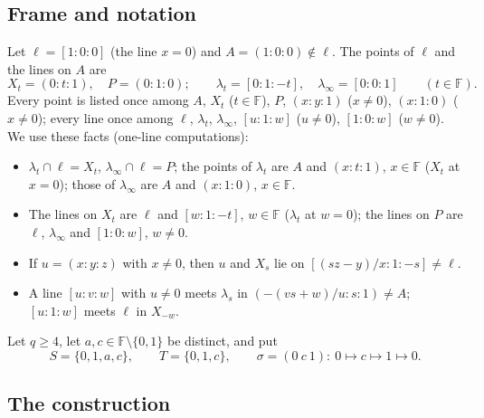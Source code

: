 \documentclass[11pt]{amsart}
\theoremstyle{definition}
\theoremstyle{remark}
\numberwithin{equation}{section}
\newcommand{\F}{\mathbb F}
\begin{document}
\subsection{Frame and notation}
Let $\ell=[1:0:0]$ (the line $x=0$) and $A=(1:0:0)\notin\ell$. The points of $\ell$ and the lines on $A$ are
\[
X_t=(0:t:1),\quad P=(0:1:0);\qquad \lambda_t=[0:1:-t],\quad \lambda_\infty=[0:0:1]\qquad(t\in\F).
\]
Every point is listed once among $A$, $X_t$ ($t\in\F$), $P$, $(x:y:1)$ ($x\ne0$), $(x:1:0)$ ($x\ne0$); every line
once among $\ell$, $\lambda_t$, $\lambda_\infty$, $[u:1:w]$ ($u\ne0$), $[1:0:w]$ ($w\ne0$). We use these facts
(one-line computations):
\begin{itemize}
\item[(F1)] $\lambda_t\cap\ell=X_t$, $\lambda_\infty\cap\ell=P$; the points of $\lambda_t$ are $A$ and $(x:t:1)$,
  $x\in\F$ ($X_t$ at $x=0$); those of $\lambda_\infty$ are $A$ and $(x:1:0)$, $x\in\F$.
\item[(F2)] The lines on $X_t$ are $\ell$ and $[w:1:-t]$, $w\in\F$ ($\lambda_t$ at $w=0$); the lines on $P$ are $\ell$,
  $\lambda_\infty$ and $[1:0:w]$, $w\ne0$.
\item[(F3)] If $u=(x:y:z)$ with $x\ne0$, then $u$ and $X_s$ lie on $[(sz-y)/x:1:-s]\ne\ell$.
\item[(F4)] A line $[u:v:w]$ with $u\ne0$ meets $\lambda_s$ in $(-(vs+w)/u:s:1)\ne A$; $[u:1:w]$ meets $\ell$ in
  $X_{-w}$.
\end{itemize}
Let $q\ge4$, let $a,c\in\F\setminus\{0,1\}$ be distinct, and put
\[
S=\{0,1,a,c\},\qquad T=\{0,1,c\},\qquad \sigma=(0\ c\ 1):\ 0\mapsto c\mapsto1\mapsto0 .
\]

\subsection{The construction}
\end{document}
